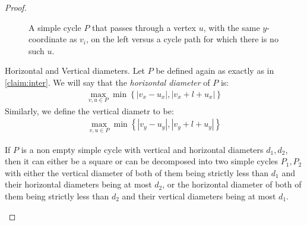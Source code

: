 \documentclass[12pt,a4paper]{article}
\begin{document}
\begin{proof}
\begin{figure}[h]
\caption{
A simple cycle $P$ that passes through a vertex $u$, with the same $y$-coordinate as $v_i$, on the left versus a cycle path for which there is no such $u$.
}
\end{figure}

  \begin{definition}
    Horizontal and Vertical diameters. Let $P$ be defined again as exactly as in \cref{claim:inter}. We will say that the \textit{horizontal diameter} of $P$ is: 
    \begin{equation*}
      \begin{split}
        \max_{v,u\in P} \min{ \left\{  | v_{x} -u_{x}|, |v_{x} + l + u_{x}| \right\} }  
      \end{split}
    \end{equation*}
    Similarly, we define the vertical diametr to be: 
    \begin{equation*}
      \begin{split}
        \max_{v,u\in P} \min{ \left\{  | v_{y} -u_{y}|, |v_{y} + l + u_{y}| \right\} }  
      \end{split}
    \end{equation*}
  \end{definition}

  \begin{claim} \label{claim:reduce}
If $P$ is a non empty simple cycle with vertical and horizontal diameters $d_{1}, d_{2}$, then it can either be a square or can be decomposed into two simple cycles $P_{1},P_{2}$ with either the vertical diameter of both of them being strictly less than $d_{1}$ and their horizontal diameters being at most $d_{2}$, or the horizontal diameter of both of them being strictly less than $d_{2}$ and their vertical diameters being at most $d_{1}$.
  \end{claim}


\end{proof}
\end{document}
